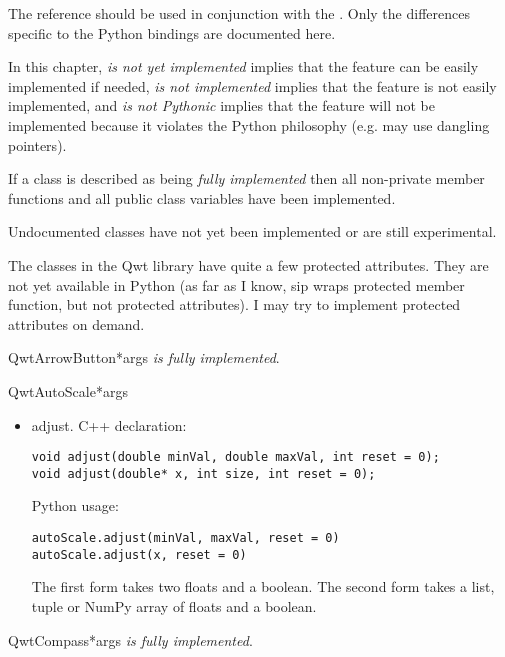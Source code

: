 \documentclass{manual}
\begin{document}
The reference should be used in conjunction with the
.
Only the differences specific to the Python bindings are documented here.

In this chapter, \emph{is not yet implemented} implies that the feature can
be easily implemented if needed, \emph{is not implemented} implies that the
feature is not easily implemented, and \emph{is not Pythonic} implies that
the feature will not be implemented because it violates the Python philosophy
(e.g. may use dangling pointers).

If a class is described as being \emph{fully implemented} then all non-private
member functions and all public class variables have been implemented.

Undocumented classes have not yet been implemented or are still experimental.

The classes in the Qwt library have quite a few protected attributes.
They are not yet available in Python (as far as I know, sip wraps
protected member function, but not protected attributes).
I may try to implement protected attributes on demand.

\begin{classdesc}{QwtArrowButton}{*args}
\emph{is fully implemented}.
\end{classdesc}

\begin{classdesc}{QwtAutoScale}{*args}

  \begin{itemize}
  
    \item{adjust}. C++ declaration:
      \begin{verbatim}
void adjust(double minVal, double maxVal, int reset = 0);
void adjust(double* x, int size, int reset = 0);
      \end{verbatim}
      Python usage:
      \begin{verbatim}
autoScale.adjust(minVal, maxVal, reset = 0)
autoScale.adjust(x, reset = 0)
    \end{verbatim}
      The first form takes two floats and a boolean.
      The second form takes a list, tuple or NumPy array of floats and a
      boolean.

  \end{itemize}
\end{classdesc}

\begin{classdesc}{QwtCompass}{*args}
\emph{is fully implemented}.
\end{classdesc}
\end{document}
